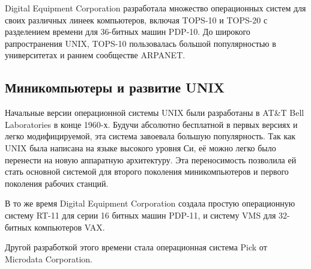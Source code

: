 Digital Equipment Corporation разработала множество операционных систем для своих различных линеек компьютеров, включая TOPS-10 и TOPS-20 с разделением времени для 36-битных машин PDP-10. До широкого рапространения UNIX, TOPS-10 пользовалась большой популярностью в университетах и раннем сообществе ARPANET.

\subsection{Миникомпьютеры и развитие UNIX}\label{base:os:history:unix}
Начальные версии операционной системы UNIX были разработаны в AT\&T Bell Laboratories в конце 1960-х. Будучи абсолютно бесплатной в первых версиях и легко модифицируемой, эта система завоевала большую популярность. Так как UNIX была написана на языке высокого уровня Си, её можно легко было перенести на новую аппаратную архитектуру. Эта переносимость позволила ей стать основной системой для второго поколения миникомпьютеров и первого поколения рабочих станций.

В то же время Digital Equipment Corporation создала простую операционную систему RT-11 для серии 16 битных машин PDP-11, и систему VMS для 32-битных компьютеров VAX.

Другой разработкой этого времени стала операционная система Pick от Microdata Corporation.
